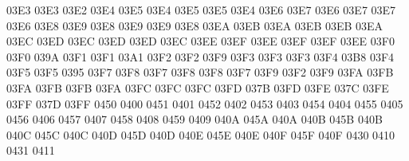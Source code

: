 \setcclcucx 03E3 03E3 03E2 %
\setcclcucx 03E4 03E5 03E4 %
\setcclcucx 03E5 03E5 03E4 %
\setcclcucx 03E6 03E7 03E6 %
\setcclcucx 03E7 03E7 03E6 %
\setcclcucx 03E8 03E9 03E8 %
\setcclcucx 03E9 03E9 03E8 %
\setcclcucx 03EA 03EB 03EA %
\setcclcucx 03EB 03EB 03EA %
\setcclcucx 03EC 03ED 03EC %
\setcclcucx 03ED 03ED 03EC %
\setcclcucx 03EE 03EF 03EE %
\setcclcucx 03EF 03EF 03EE %
\setcclcucx 03F0 03F0 039A %
\setcclcucx 03F1 03F1 03A1 %
\setcclcucx 03F2 03F2 03F9 %
\setcclcucx 03F3 03F3 03F3 %
\setcclcucx 03F4 03B8 03F4 %
\setcclcucx 03F5 03F5 0395 %
\setcclcucx 03F7 03F8 03F7 %
\setcclcucx 03F8 03F8 03F7 %
\setcclcucx 03F9 03F2 03F9 %
\setcclcucx 03FA 03FB 03FA %
\setcclcucx 03FB 03FB 03FA %
\setcclcucx 03FC 03FC 03FC %
\setcclcucx 03FD 037B 03FD %
\setcclcucx 03FE 037C 03FE %
\setcclcucx 03FF 037D 03FF %
 0450 0400 %
 0451 0401 %
 0452 0402 %
 0453 0403 %
 0454 0404 %
 0455 0405 %
 0456 0406 %
 0457 0407 %
 0458 0408 %
 0459 0409 %
\setcclcucx 040A 045A 040A %
\setcclcucx 040B 045B 040B %
\setcclcucx 040C 045C 040C %
\setcclcucx 040D 045D 040D %
\setcclcucx 040E 045E 040E %
\setcclcucx 040F 045F 040F %
 0430 0410 %
 0431 0411 %
